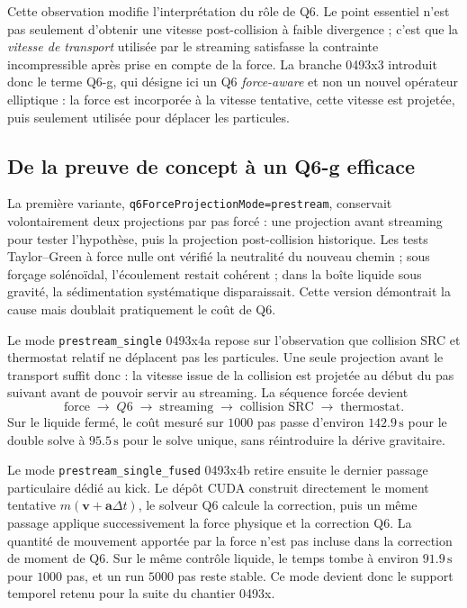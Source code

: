 \documentclass[11pt,a4paper]{article}
\begin{document}
Cette observation modifie l'interprétation du rôle de Q6. Le point essentiel n'est pas seulement d'obtenir une vitesse post-collision à faible divergence ; c'est que la \emph{vitesse de transport} utilisée par le streaming satisfasse la contrainte incompressible après prise en compte de la force. La branche 0493x3 introduit donc le terme Q6-g, qui désigne ici un Q6 \emph{force-aware} et non un nouvel opérateur elliptique : la force est incorporée à la vitesse tentative, cette vitesse est projetée, puis seulement utilisée pour déplacer les particules.

\subsection{De la preuve de concept à un Q6-g efficace}

La première variante, \texttt{q6ForceProjectionMode=prestream}, conservait volontairement deux projections par pas forcé : une projection avant streaming pour tester l'hypothèse, puis la projection post-collision historique. Les tests Taylor--Green à force nulle ont vérifié la neutralité du nouveau chemin ; sous forçage solénoïdal, l'écoulement restait cohérent ; dans la boîte liquide sous gravité, la sédimentation systématique disparaissait. Cette version démontrait la cause mais doublait pratiquement le coût de Q6.

Le mode \texttt{prestream\_single} 0493x4a repose sur l'observation que collision SRC et thermostat relatif ne déplacent pas les particules. Une seule projection avant le transport suffit donc : la vitesse issue de la collision est projetée au début du pas suivant avant de pouvoir servir au streaming. La séquence forcée devient
\begin{equation}
  \text{force}\;\longrightarrow\;Q6\;\longrightarrow\;\text{streaming}
  \;\longrightarrow\;\text{collision SRC}\;\longrightarrow\;\text{thermostat}.
\end{equation}
Sur le liquide fermé, le coût mesuré sur $1000$ pas passe d'environ $142.9\,\mathrm{s}$ pour le double solve à $95.5\,\mathrm{s}$ pour le solve unique, sans réintroduire la dérive gravitaire.

Le mode \texttt{prestream\_single\_fused} 0493x4b retire ensuite le dernier passage particulaire dédié au kick. Le dépôt CUDA construit directement le moment tentative $m(\bm v+\bm a\Delta t)$, le solveur Q6 calcule la correction, puis un même passage applique successivement la force physique et la correction Q6. La quantité de mouvement apportée par la force n'est pas incluse dans la correction de moment de Q6. Sur le même contrôle liquide, le temps tombe à environ $91.9\,\mathrm{s}$ pour $1000$ pas, et un run $5000$ pas reste stable. Ce mode devient donc le support temporel retenu pour la suite du chantier 0493x.
\end{document}
